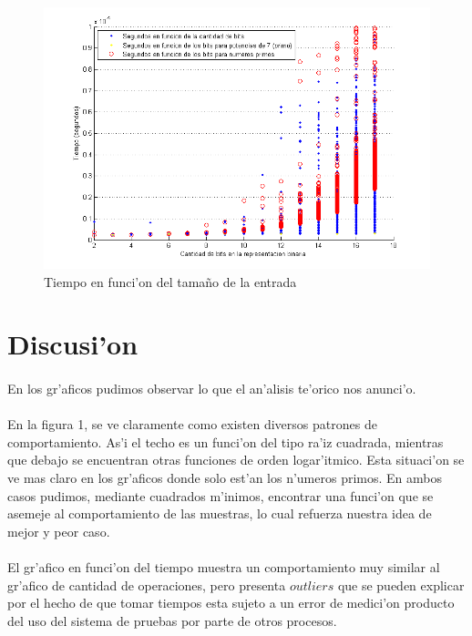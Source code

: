 \begin{figure}[H]
\centering
\includegraphics[scale=0.65]{../../codigo/ejercicio1/benchmark_de_tiempo/graficos/tamanio_Entrada_T/Tiempo_en_funcion_bits.png}
\caption{Tiempo en funci'on del tama\~{n}o de la entrada}
\label{Ej1fig6}
\end{figure}
\newpage
\section{Discusi'on}
\paragraph{}
En los gr'aficos pudimos observar lo que el an'alisis te'orico nos anunci'o.
\paragraph{}
En la figura 1, se ve claramente como existen diversos patrones de comportamiento. As'i el techo es un funci'on del tipo ra'iz 
cuadrada, mientras que debajo se encuentran otras funciones de orden logar'itmico. Esta situaci'on se ve mas claro en los 
gr'aficos donde solo est'an los n'umeros primos. En ambos casos pudimos, mediante cuadrados m'inimos, 
encontrar una funci'on que se asemeje al comportamiento de las muestras, lo cual refuerza nuestra idea de mejor y peor caso.
\paragraph{}
El gr'afico en funci'on del tiempo muestra un comportamiento muy similar al gr'afico de cantidad de operaciones, pero presenta 
$outliers$ que se pueden explicar por el hecho de que tomar tiempos esta sujeto a un error de medici'on producto del uso del sistema
de pruebas por parte de otros procesos.

